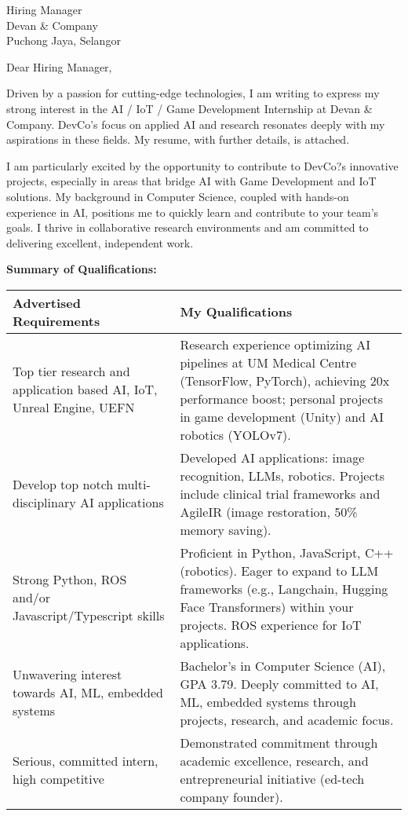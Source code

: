 \documentclass[10.5pt]{letter}
\date{\today}
\begin{document}
\begin{letter}{Hiring Manager\\Devan \& Company\\Puchong Jaya, Selangor}

\opening{Dear Hiring Manager,}

Driven by a passion for cutting-edge technologies, I am writing to express my strong interest in the AI / IoT / Game Development Internship at Devan \& Company.  DevCo's focus on applied AI and research resonates deeply with my aspirations in these fields. My resume, with further details, is attached.

I am particularly excited by the opportunity to contribute to DevCo?s innovative projects, especially in areas that bridge AI with Game Development and IoT solutions.  My background in Computer Science, coupled with hands-on experience in AI, positions me to quickly learn and contribute to your team's goals. I thrive in collaborative research environments and am committed to delivering excellent, independent work.

\vspace{0.3cm}
\textbf{Summary of Qualifications:}
\vspace{0.2cm}

\renewcommand{\arraystretch}{1.3}
\begin{tabularx}{\textwidth}{@{}p{}X@{}}
\textbf{Advertised Requirements} & \textbf{My Qualifications} \\
\hline
Top tier research and application based AI, IoT, Unreal Engine, UEFN & Research experience optimizing AI pipelines at UM Medical Centre (TensorFlow, PyTorch), achieving 20x performance boost;  personal projects in game development (Unity) and AI robotics (YOLOv7). \\
Develop top notch multi-disciplinary AI applications & Developed AI applications: image recognition, LLMs, robotics. Projects include clinical trial frameworks and AgileIR (image restoration, 50\% memory saving). \\
Strong Python, ROS and/or Javascript/Typescript skills & Proficient in Python, JavaScript, C++ (robotics). Eager to expand to LLM frameworks (e.g., Langchain, Hugging Face Transformers) within your projects.  ROS experience for IoT applications. \\
Unwavering interest towards AI, ML, embedded systems & Bachelor's in Computer Science (AI), GPA 3.79. Deeply committed to AI, ML, embedded systems through projects, research, and academic focus. \\
Serious, committed intern, high competitive & Demonstrated commitment through academic excellence, research, and entrepreneurial initiative (ed-tech company founder). \\
\end{tabularx}


\end{letter}
\end{document}
